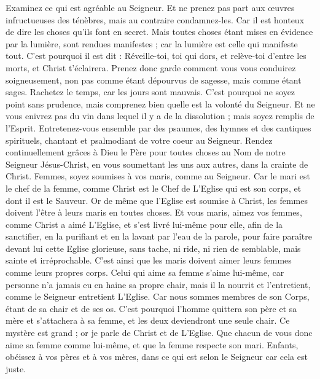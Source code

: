 \begin{multicols}{2}
Examinez ce qui est agréable au Seigneur.
Et ne prenez pas part aux œuvres infructueuses des ténèbres, mais au contraire condamnez-les.
Car il est honteux de dire les choses qu'ils font en secret.
Mais toutes choses étant mises en évidence par la lumière, sont rendues manifestes ; car la lumière est celle qui manifeste tout.
C'est pourquoi il est dit : Réveille-toi, toi qui dors, et relève-toi d'entre les morts, et Christ t'éclairera.
Prenez donc garde comment vous vous conduirez soigneusement, non pas comme étant dépourvus de sagesse, mais comme étant sages.
Rachetez le temps, car les jours sont mauvais.
C'est pourquoi ne soyez point sans prudence, mais comprenez bien quelle est la volonté du Seigneur.
Et ne vous enivrez pas du vin dans lequel il y a de la dissolution ; mais soyez remplis de l'Esprit.
Entretenez-vous ensemble par des psaumes, des hymnes et des cantiques spirituels, chantant et psalmodiant de votre coeur au Seigneur.
Rendez continuellement grâces à Dieu le Père pour toutes choses au Nom de notre Seigneur Jésus-Christ,
en vous soumettant les uns aux autres, dans la crainte de Christ.
Femmes, soyez soumises à vos maris, comme au Seigneur.
Car le mari est le chef de la femme, comme Christ est le Chef de L'Eglise qui est son corps, et dont il est le Sauveur.
Or de même que l'Eglise est soumise à Christ, les femmes doivent l'être à leurs maris en toutes choses.
Et vous maris, aimez vos femmes, comme Christ a aimé L'Eglise, et s'est livré lui-même pour elle,
afin de la sanctifier, en la purifiant et en la lavant par l'eau de la parole,
pour faire paraître devant lui cette Eglise glorieuse, sans tache, ni ride, ni rien de semblable, mais sainte et irréprochable.
C'est ainsi que les maris doivent aimer leurs femmes comme leurs propres corps. Celui qui aime sa femme s'aime lui-même,
car personne n'a jamais eu en haine sa propre chair, mais il la nourrit et l'entretient, comme le Seigneur entretient L'Eglise.
Car nous sommes membres de son Corps, étant de sa chair et de ses os.
C'est pourquoi l'homme quittera son père et sa mère et s'attachera à sa femme, et les deux deviendront une seule chair.
Ce mystère est grand ; or je parle de Christ et de L'Eglise.
Que chacun de vous donc aime sa femme comme lui-même, et que la femme respecte son mari.
\VerseOne{}Enfants, obéissez à vos pères et à vos mères, dans ce qui est selon le Seigneur car cela est juste.

\end{multicols}
